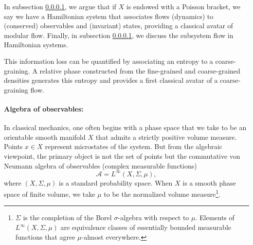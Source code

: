 \documentclass[a4paper,11pt]{article}
\theoremstyle{definition}
\newcommand{\mA}{\mathcal{A}}
\begin{document}
In subsection \ref{}, we argue that if $X$ is endowed with a Poisson bracket, we say we have a Hamiltonian system that associates flows (dynamics) to (conserved) observables and (invariant) states, providing a classical avatar of modular flow. Finally, in subsection \ref{}, we discuss the subsystem flow in Hamiltonian systems.



This information loss can be quantified by associating an entropy to a coarse-graining. A relative phase constructed from the fine-grained and coarse-grained densities generates this entropy and provides a first classical avatar of a coarse-graining flow. 


\paragraph{Algebra of observables:} In classical mechanics, one often begins with a phase space that we take to be an orientable smooth manifold \(X\) that admits a strictly positive volume measure. Points \(x\in X\) represent microstates of the system. But from the algebraic viewpoint, the primary object is not the set of points but the commutative von Neumann algebra of observables (complex measurable functions)
\[
\mA=L^\infty(X,\Sigma,\mu),
\]
where \((X,\Sigma,\mu)\) is a standard probability space. When $X$ is a smooth phase space of finite volume, we take $\mu$ to be the normalized volume measure\footnote{$\Sigma$ is the completion of the Borel $\sigma$-algebra with respect to $\mu$. Elements of $L^\infty(X,\Sigma,\mu)$ are equivalence classes of essentially bounded measurable functions that agree $\mu$-almost everywhere.}.
\end{document}

